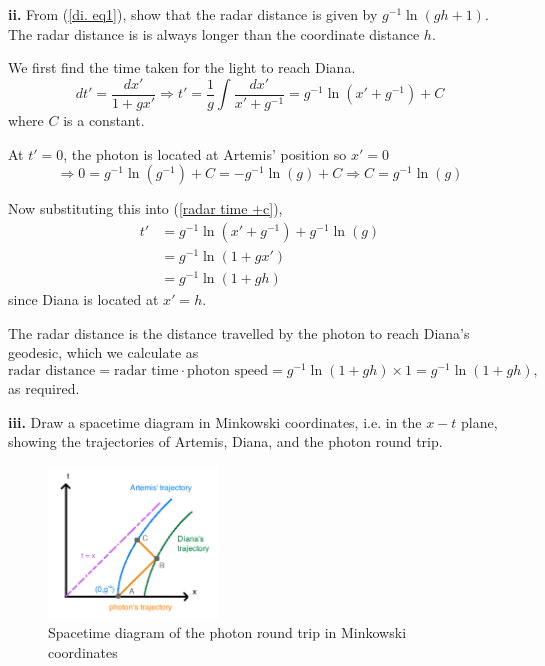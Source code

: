 \documentclass[a4paper]{article} %
\begin{document}
\begin{framed}
\textbf{ii.} From (\ref{di. eq1}), show that the radar distance is given by $g^{-1}\ln (gh+1)$. The radar distance is is always longer than the coordinate distance $h$.
\end{framed}

We first find the time taken for the light to reach Diana.
\begin{equation}
dt'=\frac{dx'}{1+gx'}\Rightarrow t'=\frac{1}{g}\int\frac{dx'}{x'+g^{-1}}=g^{-1}\ln(x'+g^{-1})+C\label{radar time +c}
\end{equation}
where $C$ is a constant.

At $t'=0$, the photon is located at Artemis' position so $x'=0$
\begin{equation}
\Rightarrow 0= g^{-1}\ln(g^{-1})+C=-g^{-1}\ln (g)+C \Rightarrow C= g^{-1}\ln (g)
\end{equation}

Now substituting this into (\ref{radar time +c}),
\begin{align}
t'&=g^{-1}\ln(x'+g^{-1})+g^{-1}\ln(g)\\
&=g^{-1}\ln(1+gx')\\
&=g^{-1}\ln(1+gh)\label{radar time}
\end{align}
since Diana is located at $x'=h$.

The radar distance is the distance travelled by the photon to reach Diana's geodesic, which we calculate as
\begin{equation}
\text{radar distance}=\text{radar time}\cdot\text{photon speed}=g^{-1}\ln(1+gh)\times 1=g^{-1}\ln(1+gh),\label{radar distance}
\end{equation}
as required.



\begin{framed}
\textbf{iii.} Draw a spacetime diagram in Minkowski coordinates, i.e. in the $x-t$ plane, showing the trajectories of Artemis, Diana, and the photon round trip.
\end{framed}

\begin{figure}[h]
\centering
\includegraphics[width=0.4\textwidth]{images/photon_round_trip.png}
\caption{Spacetime diagram of the photon round trip in Minkowski coordinates}
\label{photon round trip figure}
\end{figure}
\end{document}
